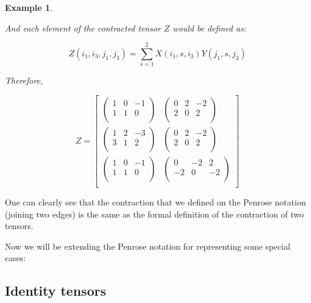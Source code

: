 \documentclass[11pt,a4paper,openright,oneside]{book}
\numberwithin{equation}{section}
\newtheorem{example0}[defn0]{Example}
\newenvironment{example}{ \begin{example0}\rm}{\end{example0}}
\begin{document}
\begin{example}
\begin{center}
    \end{center}

And each element of the contracted tensor $Z$ would be defined as:

$$Z(i_1, i_3, j_1, j_3) = \sum_{s=1}^2 X(i_1, s, i_3) Y(j_1, s, j_3)$$

Therefore,

$$Z = \begin{bmatrix}
\begin{pmatrix}
    1 & 0 & -1 \\
    1 & 1 & 0 \\
\end{pmatrix} &
\begin{pmatrix}
    0 & 2 & -2 \\
    2 & 0 & 2 \\
\end{pmatrix} \\
\begin{pmatrix}
    1 & 2 & -3 \\
    3 & 1 & 2 \\
\end{pmatrix} &
\begin{pmatrix}
    0 & 2 & -2 \\
    2 & 0 & 2 \\
\end{pmatrix} \\
\begin{pmatrix}
    1 & 0 & -1 \\
    1 & 1 & 0 \\
\end{pmatrix} &
\begin{pmatrix}
    0 & -2 & 2 \\
    -2 & 0 & -2 \\
\end{pmatrix} \\
\end{bmatrix}$$
\label{ex:bigmatrix}
\end{example}

One can clearly see that the contraction that we defined on
the Penrose notation (joining two edges) is the same as the formal definition of the contraction of two tensors.

Now we will be extending the Penrose notation for representing some special cases:

\subsection* {Identity tensors}
\end{document}
